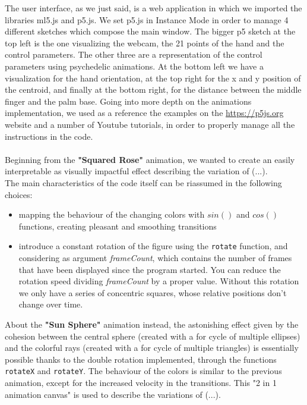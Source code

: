 \documentclass[a4paper,12pt]{report}
\begin{document}
The user interface, as we just said, is a web application in which we imported the libraries ml5.js and p5.js.  We set p5.js in Instance Mode in order to manage 4 different sketches which compose the main window. The bigger p5 sketch at the top left is the one visualizing the webcam, the 21 points of the hand and the control parameters. The other three are a representation of the control parameters using psychedelic animations. At the bottom left we have a visualization for the hand orientation, at the top right for the x and y position of the centroid, and finally at the bottom right, for the distance between the middle finger and the palm base. Going into more depth on the animations implementation, we used as a reference the examples on the \url{https://p5js.org}
website and a number of Youtube tutorials, in order to properly manage all the instructions in the code.\\
\\Beginning from the \textbf{"Squared Rose"} animation, we wanted to create an easily interpretable as visually impactful effect describing the variation of (...). \\The main characteristics of the code itself can be riassumed in the following choices:\begin{itemize}
\item mapping the behaviour of the changing colors with $sin()$ and $cos()$ functions, creating pleasant and smoothing transitions
\item introduce a constant rotation of the figure using the \texttt{rotate} function, and considering as argument \textit{frameCount}, which contains the number of frames that have been displayed since the program started. You can reduce the rotation speed dividing \textit{frameCount} by a proper value. Without this rotation we only have a series of concentric squares, whose relative positions don't change over time.
\end{itemize}
About the \textbf{"Sun Sphere"} animation instead, the astonishing effect given by the cohesion between the central sphere (created with a for cycle of multiple ellipses) and the colorful rays (created with a for cycle of multiple triangles) is essentially possible thanks to the double rotation implemented, through the functions \texttt{rotateX} and \texttt{rotateY}.
The behaviour of the colors is similar to the previous animation, except for the increased velocity in the transitions. This "2 in 1 animation canvas" is used to describe the variations of (...).\\
\end{document}
